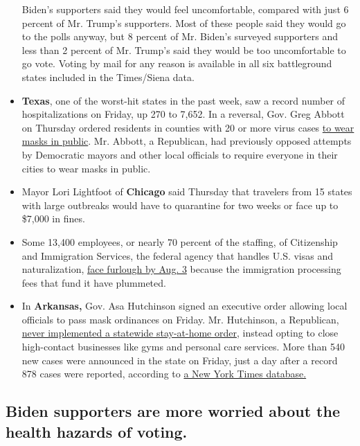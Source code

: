 \begin{itemize}
  Biden's supporters said they would feel uncomfortable, compared with
  just 6 percent of Mr. Trump's supporters. Most of these people said
  they would go to the polls anyway, but 8 percent of Mr. Biden's
  surveyed supporters and less than 2 percent of Mr. Trump's said they
  would be too uncomfortable to go vote. Voting by mail for any reason
  is available in all six battleground states included in the
  Times/Siena data.
\item
  \textbf{Texas}, one of the worst-hit states in the past week, saw a
  record number of hospitalizations on Friday, up 270 to 7,652. In a
  reversal, Gov. Greg Abbott on Thursday ordered residents in counties
  with 20 or more virus cases
  \href{https://www.nytimes3xbfgragh.onion/2020/07/02/us/coronavirus-texas-masks.html}{to
  wear masks in public}. Mr. Abbott, a Republican, had previously
  opposed attempts by Democratic mayors and other local officials to
  require everyone in their cities to wear masks in public.
\item
  Mayor Lori Lightfoot of \textbf{Chicago} said Thursday that travelers
  from 15 states with large outbreaks would have to quarantine for two
  weeks or face up to \$7,000 in fines.
\item
  Some 13,400 employees, or nearly 70 percent of the staffing, of
  Citizenship and Immigration Services, the federal agency that handles
  U.S. visas and naturalization,
  \href{https://www.nytimes3xbfgragh.onion/2020/07/03/us/politics/immigration-furloughs-coronavirus.html}{face
  furlough by Aug. 3} because the immigration processing fees that fund
  it have plummeted.
\item
  In \textbf{Arkansas,} Gov. Asa Hutchinson signed an executive order
  allowing local officials to pass mask ordinances on Friday. Mr.
  Hutchinson, a Republican,
  \href{https://www.nytimes3xbfgragh.onion/interactive/2020/us/states-reopen-map-coronavirus.html}{never
  implemented a statewide stay-at-home order}, instead opting to close
  high-contact businesses like gyms and personal care services. More
  than 540 new cases were announced in the state on Friday, just a day
  after a record 878 cases were reported, according to
  \href{https://www.nytimes3xbfgragh.onion/interactive/2020/us/arkansas-coronavirus-cases.html}{a
  New York Times database.}
\end{itemize}

\hypertarget{biden-supporters-are-more-worried-about-the-health-hazards-of-voting}{%
\subsection{Biden supporters are more worried about the health hazards
of
voting.}\label{biden-supporters-are-more-worried-about-the-health-hazards-of-voting}}

